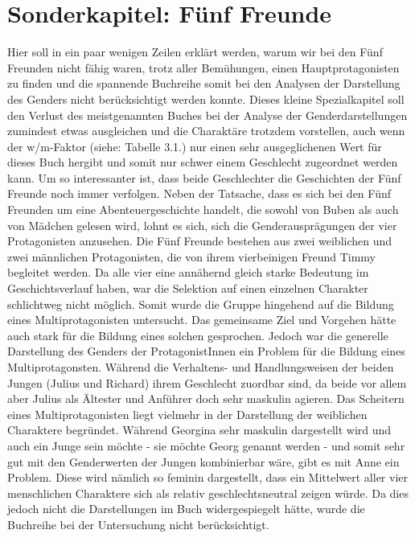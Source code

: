 \section{Sonderkapitel: Fünf Freunde}

Hier soll in ein paar wenigen Zeilen erklärt werden, warum wir bei den
Fünf Freunden nicht fähig waren, trotz aller Bemühungen, einen
Hauptprotagonisten zu finden und die spannende Buchreihe somit bei den
Analysen der Darstellung des Genders nicht berücksichtigt werden konnte.
Dieses kleine Spezialkapitel soll den Verlust des meistgenannten Buches
bei der Analyse der Genderdarstellungen zumindest etwas ausgleichen und
die Charaktäre trotzdem vorstellen, auch wenn der w/m-Faktor (siehe:
Tabelle 3.1.) nur einen sehr ausgeglichenen Wert für dieses Buch hergibt
und somit nur schwer einem Geschlecht zugeordnet werden kann. Um so
interessanter ist, dass beide Geschlechter die Geschichten der Fünf
Freunde noch immer verfolgen. Neben der Tatsache, dass es sich bei den
Fünf Freunden um eine Abenteuergeschichte handelt, die sowohl von Buben
als auch von Mädchen gelesen wird, lohnt es sich, sich die
Genderausprägungen der vier Protagonisten anzusehen. Die Fünf Freunde
bestehen aus zwei weiblichen und zwei männlichen Protagonisten, die von
ihrem vierbeinigen Freund Timmy begleitet werden. Da alle vier eine
annähernd gleich starke Bedeutung im Geschichtsverlauf haben, war die
Selektion auf einen einzelnen Charakter schlichtweg nicht möglich. Somit
wurde die Gruppe hingehend auf die Bildung eines Multiprotagonisten
untersucht. Das gemeinsame Ziel und Vorgehen hätte auch stark für die
Bildung eines solchen gesprochen. Jedoch war die generelle Darstellung
des Genders der ProtagonistInnen ein Problem für die Bildung eines
Multiprotagonsten. Während die Verhaltens- und Handlungsweisen der
beiden Jungen (Julius und Richard) ihrem Geschlecht zuordbar sind, da
beide vor allem aber Julius als Ältester und Anführer doch sehr maskulin
agieren. Das Scheitern eines Multiprotagonisten liegt vielmehr in der
Darstellung der weiblichen Charaktere begründet. Während Georgina sehr
maskulin dargestellt wird und auch ein Junge sein möchte - sie möchte
Georg genannt werden - und somit sehr gut mit den Genderwerten der
Jungen kombinierbar wäre, gibt es mit Anne ein Problem. Diese wird
nämlich so feminin dargestellt, dass ein Mittelwert aller vier
menschlichen Charaktere sich als relativ geschlechtsneutral zeigen
würde. Da dies jedoch nicht die Darstellungen im Buch widergespiegelt
hätte, wurde die Buchreihe bei der Untersuchung nicht berücksichtigt.

